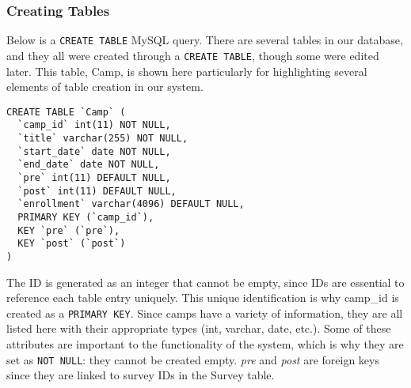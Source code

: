 \documentclass[../final.tex]{subfiles}
\begin{document}
\subsubsection{Creating Tables}
Below is a \texttt{CREATE TABLE} MySQL query.
There are several tables in our database, and they all were created through a \texttt{CREATE TABLE}, though some were edited later.
This table, Camp, is shown here particularly for highlighting several elements of table creation in our system.
\begin{lstlisting}
CREATE TABLE `Camp` (
  `camp_id` int(11) NOT NULL,
  `title` varchar(255) NOT NULL,
  `start_date` date NOT NULL,
  `end_date` date NOT NULL,
  `pre` int(11) DEFAULT NULL,
  `post` int(11) DEFAULT NULL,
  `enrollment` varchar(4096) DEFAULT NULL,
  PRIMARY KEY (`camp_id`),
  KEY `pre` (`pre`),
  KEY `post` (`post`)
) 
\end{lstlisting}
The ID is generated as an integer that cannot be empty, since IDs are essential to reference each table entry uniquely.
This unique identification is why camp\_id is created as a \texttt{PRIMARY KEY}.
Since camps have a variety of information, they are all listed here with their appropriate types (int, varchar, date, etc.).
Some of these attributes are important to the functionality of the system, which is why they are set as \texttt{NOT NULL}: they cannot be created empty.
\emph{pre} and \emph{post} are foreign keys since they are linked to survey IDs in the Survey table.
\end{document}
